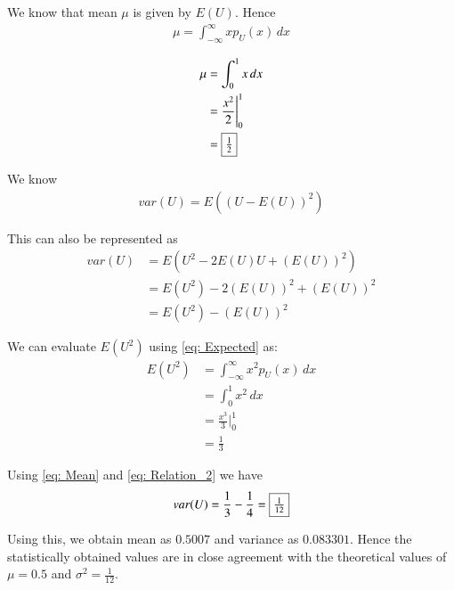 \documentclass[journal,12pt,twocolumn]{IEEEtran}
\begin{document}
We know that mean $\mu$ is given by $E(U)$. Hence
	\begin{align}
		\mu = \int_{-\infty}^{\infty} x p_U(x) \,dx
		\label{eq:Relation_1}
	\end{align}

	\begin{align}
		\mu &= \int_{0}^{1} x \,dx \\
		&= \frac{x^2}{2} \Bigg|^{1}_{0} \\
		&= \fbox{$\frac{1}{2}$} 
		\label{eq: Mean}
	\end{align}
	
We know
	\begin{align}
		var(U) = E((U - E(U))^2)
	\end{align}

	This can also be represented as
	\begin{align}
		var(U) &= E(U^2 - 2E(U)U + (E(U))^2) \\
		&= E(U^2) - 2(E(U))^2 + (E(U))^2 \\
		&= E(U^2) - (E(U))^2
		\label{eq: Relation_2}
	\end{align}

We can evaluate $E(U^2)$ using \eqref{eq: Expected} as:
	\begin{align}
		E(U^2) &= \int_{-\infty}^{\infty} x^2 p_U(x) \,dx \\
		&= \int_{0}^{1} x^2 \,dx \\
		&= \frac{x^3}{3} \Bigg|^{1}_{0} \\
		&= \frac{1}{3}
	\end{align}

Using \eqref{eq: Mean} and \eqref{eq: Relation_2} we have
	\begin{align}
		var(U) = \frac{1}{3} - \frac{1}{4} = \fbox{$\frac{1}{12}$}
	\end{align}

Using this, we obtain mean as $0.5007$ and variance as $0.083301$. Hence the statistically obtained values are in close agreement with the theoretical values of $\mu = 0.5$ and $\sigma^2 = \frac{1}{12}$.
\end{document}
